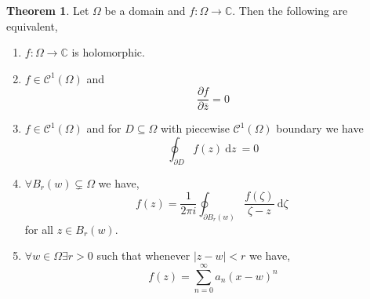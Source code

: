 \documentclass[12pt]{extarticle}
\newcommand{\C}{\mathbb{C}}
\renewcommand{\d}[1]{\: \mathrm{d}#1 \:}
\newcommand{\pderiv}[2]{\frac{\partial{#1}}{\partial{#2}}}
\theoremstyle{definition}
\newtheorem{theorem}{Theorem}[section]
\newcommand{\Class}[2]{\mathcal{C}^{#1} \left( #2 \right)}
\begin{document}
\begin{theorem}
Let $\Omega$ be a domain and $f : \Omega \to \C$. Then the following are equivalent,
\begin{enumerate}
\item $f : \Omega \to \C$ is holomorphic.
\item $f \in \Class{1}{\Omega}$ and 
\[ \pderiv{f}{\bar{z}} = 0 \]
\item $f \in \Class{1}{\Omega}$ and for $D \subseteq \Omega$ with piecewise $\Class{1}{\Omega}$ boundary we have \[ \oint_{\partial D} f(z) \d{z} = 0 \]
\item $\forall B_{r}(w) \subsetneq \Omega$ we have,
\[ f(z) = \frac{1}{2 \pi i} \oint_{\partial B_{r}(w)} \frac{f(\zeta)}{\zeta - z} \d{\zeta} \] 
for all $z \in B_r(w)$. 
\item $\forall w \in \Omega \exists r > 0$ such that whenever $|z - w| < r$ we have,
\[ f(z) = \sum_{n = 0}^\infty a_n(x - w)^n \]
\end{enumerate}
\end{theorem}
\end{document}
